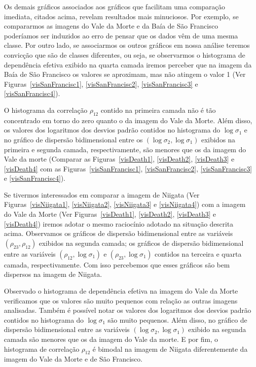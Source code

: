 \documentclass[a4paper,12pt]{article}
\begin{document}
Os demais gráficos associados aos gráficos que facilitam uma comparação imediata, citados acima, revelam resultados mais minuciosos. Por exemplo, se compararmos as imagens do Vale da Morte e da Baía de São Francisco poderíamos ser induzidos ao erro de pensar que os dados vêm de uma mesma classe. Por outro lado, se associarmos os outros gráficos em nossa análise teremos convicção que são de classes diferentes, ou seja, se observarmos o histograma de dependência efetiva exibido na quarta camada iremos perceber que na imagem da Baía de São Francisco os valores se aproximam, mas não atingem o valor 1 (Ver Figuras~\ref{visSanFrancisc1}, \ref{visSanFrancisc2}, \ref{visSanFrancisc3} e \ref{visSanFrancisc4}).

O histograma da correlação $\rho_{12}$ contido na primeira camada não é tão concentrado em torno do zero quanto o da imagem do Vale da Morte. Além disso, os valores dos logaritmos dos desvios padrão contidos no histograma do $\log\sigma_{1}$ e no gráfico de dispersão bidimensional entre os $(\log\sigma_{2},\log\sigma_{1})$ exibidos na primeira e segunda camada, respectivamente, são menores que os da imagem do Vale da morte (Comparar as Figuras~\ref{visDeath1}, \ref{visDeath2}, \ref{visDeath3} e \ref{visDeath4} com as Figuras~\ref{visSanFrancisc1}, \ref{visSanFrancisc2}, \ref{visSanFrancisc3} e \ref{visSanFrancisc4}).   

Se tivermos interessados em comparar a imagem de Niigata (Ver Figuras~\ref{visNiigata1}, \ref{visNiigata2}, \ref{visNiigata3} e \ref{visNiigata4}) com a imagem do Vale da Morte (Ver Figuras~\ref{visDeath1}, \ref{visDeath2}, \ref{visDeath3} e \ref{visDeath4}) iremos adotar o mesmo raciocínio adotado na situação descrita acima. Observamos os gráficos de dispersão bidimensional entre as variáveis $(\rho_{23}, \rho_{12})$ exibidos na segunda camada; os gráficos de dispersão bidimensional entre as variáveis $(\rho_{12},\log\sigma_{1})$ e $(\rho_{23},\log\sigma_{1})$ contidos na terceira e quarta camada, respectivamente. Com isso percebemos que esses gráficos são bem dispersos na imagem de Niigata.

Observado o histograma de dependência efetiva na imagem do Vale da Morte verificamos que os valores são muito pequenos com relação as outras imagens analisadas. Também é possível notar os valores dos logaritmos dos desvios padrão contidos no histograma do $\log\sigma_{1}$ são muito pequenos. Além disso, no gráfico de dispersão bidimensional entre as variáveis $(\log\sigma_{2},\log\sigma_{1})$ exibido na segunda camada são menores que os da imagem do Vale da morte. E por fim, o histograma de correlação $\rho_{12}$ é bimodal na imagem de Niigata diferentemente da imagem do Vale da Morte e de São Francisco.      
\end{document}
